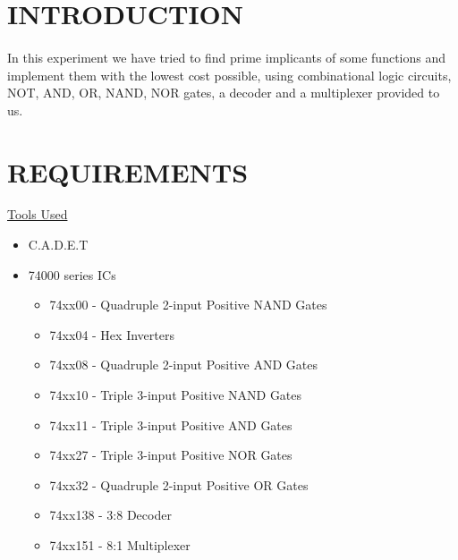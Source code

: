 \documentclass[pdftex,12pt,a4paper]{article}
\begin{document}
\setcounter{page}{1}

\section{INTRODUCTION}
\begin{flushleft}
\paragraph{}
In this experiment we have tried to find prime implicants of some functions and implement them with the lowest cost possible, using combinational logic circuits, NOT, AND, OR, NAND, NOR gates, a decoder and a multiplexer provided to us.
\end{flushleft}

\section{REQUIREMENTS}
\begin{flushleft}
\underline{Tools Used}\cite{booklet}
\end{flushleft}
\begin{itemize}
    \item C.A.D.E.T
    \item 74000 series ICs
    \begin{itemize}
        \item 74xx00 - Quadruple 2-input Positive NAND Gates
        \item 74xx04 - Hex Inverters     
        \item 74xx08 - Quadruple 2-input Positive AND Gates
        \item 74xx10 - Triple 3-input Positive NAND Gates
        \item 74xx11 - Triple 3-input Positive AND Gates
        \item 74xx27 - Triple 3-input Positive NOR Gates
        \item 74xx32 - Quadruple 2-input Positive OR Gates
        \item 74xx138 - 3:8 Decoder
        \item 74xx151 - 8:1 Multiplexer
    \end{itemize}
\end{itemize}
\end{document}
